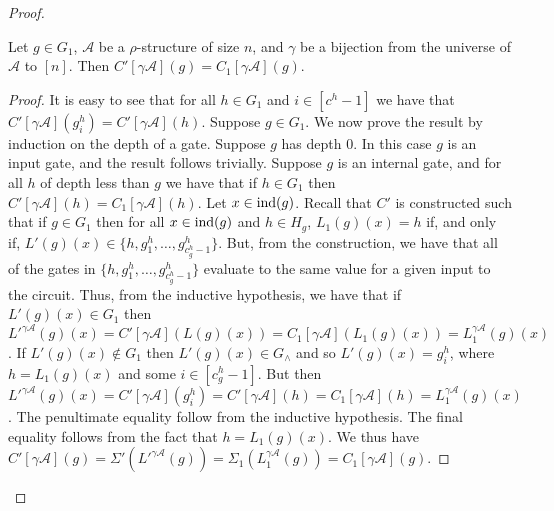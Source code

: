 \documentclass[../paper.tex]{subfiles}
\begin{document}
\begin{proof}
  \begin{claim}
    Let $g \in G_1$, $\mathcal{A}$ be a $\rho$-structure of size $n$, and
    $\gamma$ be a bijection from the universe of $\mathcal{A}$ to $[n]$. Then
    $C'[\gamma \mathcal{A}](g) = C_1[\gamma \mathcal{A}](g)$.
  \end{claim}
  \begin{proof}
    It is easy to see that for all $h \in G_1$ and $i \in [c^h-1]$ we have that
    $C'[\gamma \mathcal{A}](g^h_i) = C'[\gamma \mathcal{A}](h)$. Suppose $g \in
    G_1$. We now prove the result by induction on the depth of a gate. Suppose
    $g$ has depth $0$. In this case $g$ is an input gate, and the result follows
    trivially. Suppose $g$ is an internal gate, and for all $h$ of depth less
    than $g$ we have that if $h \in G_1$ then $C'[\gamma \mathcal{A}](h) =
    C_1[\gamma \mathcal{A}](h)$. Let $x \in \text{\upshape ind}(g)$. Recall that $C'$ is
    constructed such that if $g \in G_1$ then for all $x \in \text{\upshape ind}(g)$ and $h \in
    H_g$, $L_1(g)(x) = h$ if, and only if, $L'(g)(x) \in \{h, g^h_1, \ldots ,
    g^h_{c^h_g - 1}\}$. But, from the construction, we have that all of the
    gates in $\{h, g^h_1, \ldots, g^h_{c^h_g -1}\}$ evaluate to the same value
    for a given input to the circuit. Thus, from the inductive hypothesis, we
    have that if $L'(g)(x) \in G_1$ then $ {L'}^{\gamma \mathcal{A}}(g)(x) =
    C'[\gamma \mathcal{A}](L(g)(x)) = C_1[\gamma \mathcal{A}](L_1(g)(x)) =
    L^{\gamma \mathcal{A}}_1(g)(x) $. If $L'(g)(x) \not\in G_1$ then $L'(g)(x)
    \in G_{\land}$ and so $L'(g)(x) = g^h_i$, where $h = L_1(g)(x)$ and some $i
    \in [c^h_g -1]$. But then ${L'}^{\gamma \mathcal{A}}(g)(x) = C'[\gamma
    \mathcal{A}](g^h_i) = C'[\gamma \mathcal{A}](h) = C_1[\gamma \mathcal{A}](h)
    = L^{\gamma \mathcal{A}}_1(g)(x)$. The penultimate equality follow from the
    inductive hypothesis. The final equality follows from the fact that $h = L_1
    (g)(x)$. We thus have $C'[\gamma \mathcal{A}](g) = \Sigma'({L'}^{\gamma
      \mathcal{A}}(g)) = \Sigma_1 (L^{\gamma \mathcal{A}}_1(g)) = C_1[\gamma
    \mathcal{A}](g)$.
  \end{proof}


\end{proof}
\end{document}
